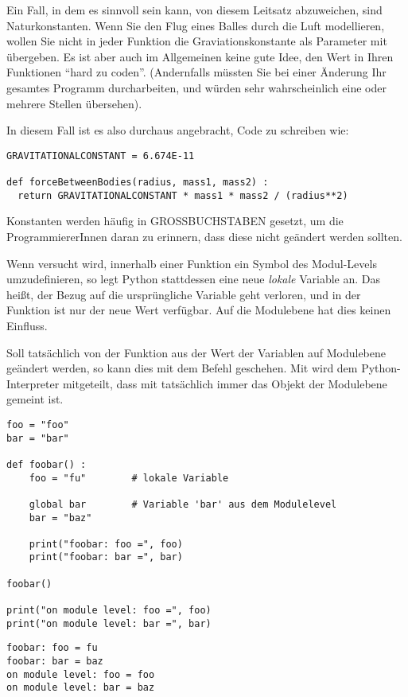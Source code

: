 \begin{hintbox}[Konstanten]
Ein Fall, in dem es sinnvoll sein kann, von diesem Leitsatz abzuweichen, sind Naturkonstanten. Wenn Sie den Flug eines Balles durch die Luft modellieren, wollen Sie nicht in jeder Funktion die Graviationskonstante als Parameter mit übergeben. Es ist aber auch im Allgemeinen keine gute Idee, den Wert in Ihren Funktionen \enquote{hard zu coden}. (Andernfalls müssten Sie bei einer Änderung Ihr gesamtes Programm durcharbeiten, und würden sehr wahrscheinlich eine oder mehrere Stellen übersehen).
\end{hintbox}
\begin{hintbox}[]
In diesem Fall ist es also durchaus angebracht, Code zu schreiben wie:
\begin{codebox}
\begin{verbatim}
GRAVITATIONALCONSTANT = 6.674E-11

def forceBetweenBodies(radius, mass1, mass2) :
  return GRAVITATIONALCONSTANT * mass1 * mass2 / (radius**2)
\end{verbatim}
\end{codebox}
Konstanten werden häufig in GROSSBUCHSTABEN gesetzt, um die ProgrammiererInnen daran zu erinnern, dass diese nicht geändert werden sollten.
\end{hintbox}

Wenn versucht wird, innerhalb einer Funktion ein Symbol des Modul-Levels umzudefinieren, so legt Python stattdessen eine neue \emph{lokale} Variable an. Das heißt, der Bezug auf die ursprüngliche Variable geht verloren, und in der Funktion ist nur der neue Wert verfügbar. Auf die Modulebene hat dies keinen Einfluss.

Soll tatsächlich von der Funktion aus der Wert der Variablen auf Modulebene geändert werden, so kann dies mit dem Befehl  geschehen. Mit  wird dem Python-Interpreter mitgeteilt, dass mit  tatsächlich immer das Objekt der Modulebene gemeint ist.

\begin{codebox}
\begin{verbatim}
foo = "foo"
bar = "bar"

def foobar() :
    foo = "fu"        # lokale Variable
  
    global bar        # Variable 'bar' aus dem Modulelevel
    bar = "baz"

    print("foobar: foo =", foo)
    print("foobar: bar =", bar)

foobar()

print("on module level: foo =", foo)
print("on module level: bar =", bar)
\end{verbatim}
\end{codebox}
\begin{cmdbox}
\begin{verbatim}
foobar: foo = fu
foobar: bar = baz
on module level: foo = foo
on module level: bar = baz
\end{verbatim}
\end{cmdbox}


